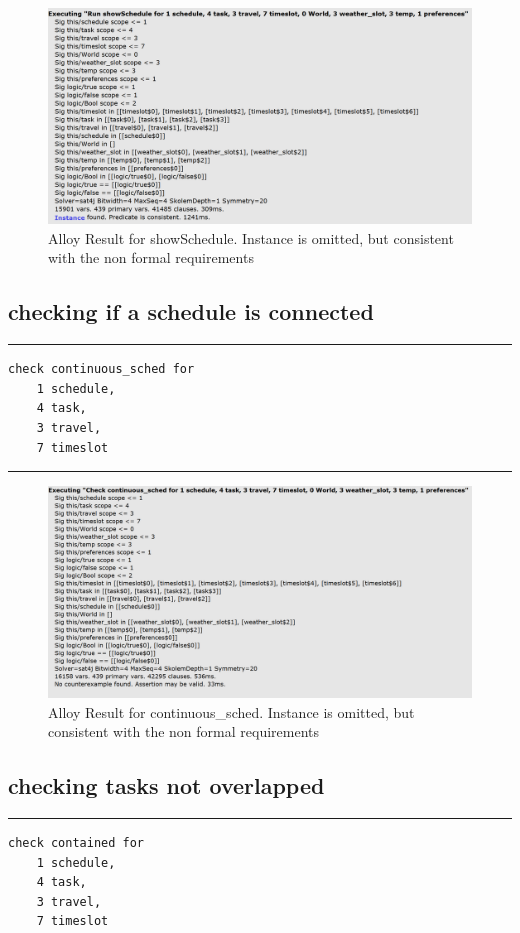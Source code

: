 \begin{figure}[H]
\centering
\includegraphics[scale=0.7]{Pictures/showSchedule.PNG}
\caption{Alloy Result for showSchedule. Instance is omitted, but
consistent with the non formal requirements}
\end{figure}
\subsection{checking if a schedule is connected}
\rule{\textwidth}{0.4pt}
\begin{verbatim}
check continuous_sched for  
    1 schedule, 
    4 task, 
    3 travel, 
    7 timeslot
\end{verbatim}
\rule{\textwidth}{0.4pt}

\begin{figure}[H]
\centering
\includegraphics[scale=0.7]{Pictures/assert_continuous.PNG}
\caption{Alloy Result for continuous_sched. Instance is omitted, but
consistent with the non formal requirements}
\end{figure}
\subsection{checking tasks not overlapped}
\rule{\textwidth}{0.4pt}
\begin{verbatim}
check contained for 
    1 schedule, 
    4 task, 
    3 travel, 
    7 timeslot
\end{verbatim}

